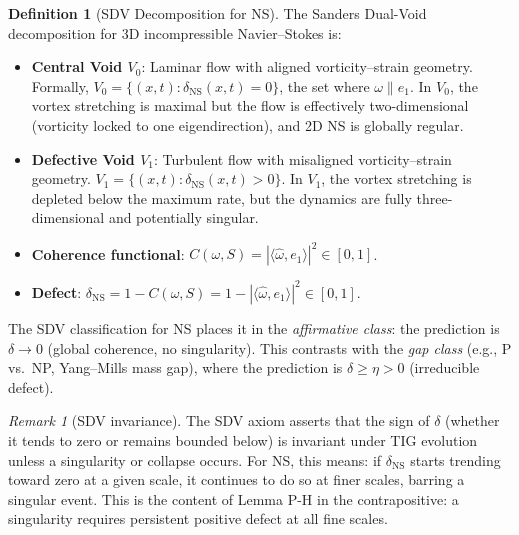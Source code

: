 \documentclass[11pt]{article}
\theoremstyle{definition}
\newtheorem{definition}[theorem]{Definition}
\theoremstyle{remark}
\newtheorem{remark}[theorem]{Remark}
\begin{document}
\begin{definition}[SDV Decomposition for NS]
\label{def:SDV-NS}
The Sanders Dual-Void decomposition for 3D incompressible Navier--Stokes is:
\begin{itemize}[nosep]
  \item \textbf{Central Void $V_0$}:  Laminar flow with aligned vorticity--strain
    geometry.  Formally, $V_0 = \{(x,t) : \delta_{\mathrm{NS}}(x,t) = 0\}$, the
    set where $\omega \| e_1$.  In $V_0$, the vortex stretching is maximal but
    the flow is effectively two-dimensional (vorticity locked to one eigendirection),
    and 2D NS is globally regular.
  \item \textbf{Defective Void $V_1$}: Turbulent flow with misaligned vorticity--strain
    geometry.  $V_1 = \{(x,t) : \delta_{\mathrm{NS}}(x,t) > 0\}$.  In $V_1$, the
    vortex stretching is depleted below the maximum rate, but the dynamics are fully
    three-dimensional and potentially singular.
  \item \textbf{Coherence functional}: $C(\omega, S) = |\langle\hat\omega, e_1\rangle|^2
    \in [0,1]$.
  \item \textbf{Defect}: $\delta_{\mathrm{NS}} = 1 - C(\omega, S)
    = 1 - |\langle\hat\omega, e_1\rangle|^2 \in [0,1]$.
\end{itemize}
\end{definition}

The SDV classification for NS places it in the \emph{affirmative class}: the
prediction is $\delta \to 0$ (global coherence, no singularity).  This contrasts with
the \emph{gap class} (e.g., P vs.\ NP, Yang--Mills mass gap), where the prediction
is $\delta \geq \eta > 0$ (irreducible defect).

\begin{remark}[SDV invariance]
The SDV axiom asserts that the sign of $\delta$ (whether it tends to zero or remains
bounded below) is invariant under TIG evolution unless a singularity or collapse
occurs.  For NS, this means: if $\delta_{\mathrm{NS}}$ starts trending toward zero
at a given scale, it continues to do so at finer scales, barring a singular event.
This is the content of Lemma P-H in the contrapositive: a singularity requires
persistent positive defect at all fine scales.
\end{remark}
\end{document}
